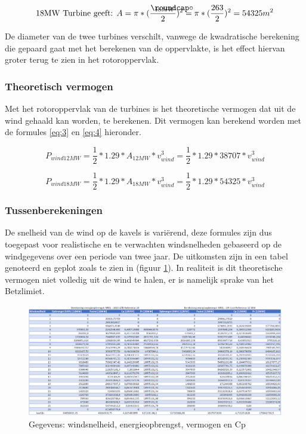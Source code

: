 \begin{equation} \label{eq:2}
\text{18MW Turbine geeft: } A =\pi*(\frac{\slashcirc_{18MW}}{2})^2 = \pi*(\frac{263}{2})^2 = 54325 m^2
\end{equation}

De diameter van de twee turbines verschilt, vanwege de kwadratische berekening die gepaard gaat met het berekenen van de oppervlakte, is het effect hiervan groter terug te zien in het rotoroppervlak.
\subsubsection{Theoretisch vermogen}
Met het rotoroppervlak van de turbines is het theoretische vermogen dat uit de wind gehaald kan worden, te berekenen. Dit vermogen kan berekend worden met de formules \ref{eq:3} en \ref{eq:4} hieronder. 

\begin{equation} \label{eq:3}
    P_{wind12MW} = \frac{1}{2}*1.29*A_{12MW}*v_{wind}^3 = \frac{1}{2}*1.29*38707*v_{wind}^3
\end{equation}

\begin{equation} \label{eq:4}
    P_{wind18MW} = \frac{1}{2}*1.29*A_{18MW}*v_{wind}^3 = \frac{1}{2}*1.29*54325*v_{wind}^3
\end{equation}

\subsubsection{Tussenberekeningen}
De snelheid van de wind op de kavels is variërend, deze formules zijn dus toegepast voor realistische en te verwachten windsnelheden gebaseerd op de windgegevens over een periode van twee jaar.\cite{WindResourceAssessment} 
De uitkomsten zijn in een tabel genoteerd en geplot zoals te zien in (figuur \ref{fig:TVUW}). In realiteit is dit theoretische vermogen niet volledig uit de wind te halen, er is namelijk sprake van het Betzlimiet. 

\begin{figure}[H]
\centering
\includegraphics[width=1\textwidth]{IMG/data/overzicht/TVUW.PNG}
\caption{Gegevens: windsnelheid, energieopbrengst, vermogen en Cp}
\label{fig:TVUW}
\end{figure}

